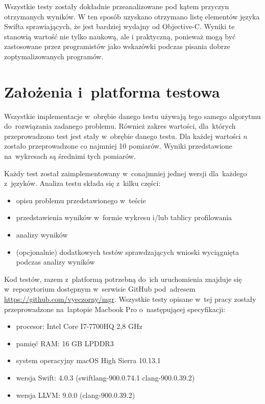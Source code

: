 \documentclass[mgr, shortabstract]{iithesis}
\begin{document}
Wszystkie testy zostały dokładnie przeanalizowane pod kątem przyczyn otrzymanych wyników. W ten sposób uzyskano otrzymano listę elementów języka Swifta sprawiających, że jest bardziej wydajny od Objective-C. Wyniki te stanowią wartość nie tylko naukową, ale i praktyczną, ponieważ mogą być zastosowane przez programistów jako wskazówki podczas pisania dobrze zoptymalizowanych programów.

\section{Założenia i~platforma testowa}

Wszystkie implementacje w~obrębie danego testu używają tego samego algorytmu do~rozwiązania zadanego problemu. Również zakres wartości, dla~których przeprowadzono test jest stały w~obrębie danego testu. Dla każdej wartości $n$ zostało przeprowadzone co najmniej 10 pomiarów. Wyniki przedstawione na~wykresach są średnimi tych pomiarów.

Każdy test został zaimplementowany w~conajmniej jednej wersji dla~każdego z~języków. Analiza testu składa się z~kilku części:

\begin{itemize}
    \item opisu problemu przedstawionego w~teście
    \item przedstawienia wyników w~formie wykresu i/lub tablicy profilowania
    \item analizy wyników
    \item (opcjonalnie) dodatkowych testów sprawdzających wnioski wyciągnięta podczas analizy wyników
\end{itemize}

Kod testów, razem z~platformą potrzebną do~ich uruchomienia znajduje się w~repozytorium dostępnym w~serwisie GitHub pod~adresem \url{https://github.com/vyeczorny/mgr}. Wszystkie testy opisane w~tej pracy zostały przeprowadzone na~laptopie Macbook Pro o~następującej specyfikacji:

\begin{itemize}
    \item procesor: Intel Core I7-7700HQ 2,8 GHz
    \item pamięć RAM: 16 GB LPDDR3
    \item system operacyjny macOS High Sierra 10.13.1
    \item wersja Swift: 4.0.3 (swiftlang-900.0.74.1 clang-900.0.39.2)
    \item wersja LLVM: 9.0.0 (clang-900.0.39.2)
\end{itemize}
\end{document}

